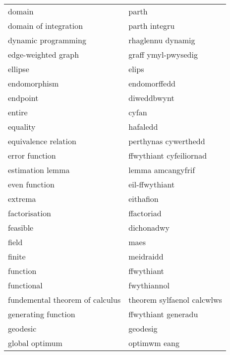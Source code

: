 \begin{supertabular}{p{0.22\textwidth}p{0.22\textwidth}}
                           domain &                            parth \\
            domain of integration &                    parth integru \\
              dynamic programming &                rhaglennu dynamig \\
              edge-weighted graph &              graff ymyl-pwysedig \\
                          ellipse &                            elips \\
                     endomorphism &                     endomorffedd \\
                         endpoint &                      diweddbwynt \\
                           entire &                            cyfan \\
                         equality &                         hafaledd \\
             equivalence relation &             perthynas cywerthedd \\
                   error function &          ffwythiant cyfeiliornad \\
                 estimation lemma &                lemma amcangyfrif \\
                    even function &                   eil-ffwythiant \\
                          extrema &                        eithafion \\
                    factorisation &                       ffactoriad \\
                         feasible &                       dichonadwy \\
                            field &                             maes \\
                           finite &                        meidraidd \\
                         function &                       ffwythiant \\
                       functional &                      fwythiannol \\
  fundemental theorem of calculus &       theorem sylfaenol calcwlws \\
              generating function &              ffwythiant generadu \\
                         geodesic &                         geodesig \\
                   global optimum &                     optimwm eang \\

\end{supertabular}
